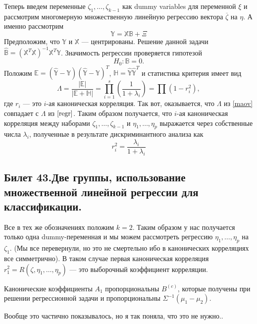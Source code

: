 Теперь введем переменные $\zeta_1, \ldots, \zeta_{k-1}$ как dummy variables для переменной $\xi$ и рассмотрим многомерную множественную линейную регрессию вектора $\overline{\zeta}$ на $\eta$.
А именно рассмотрим
\begin{equation*}
\mathbb{Y} = \mathbb{X}\mathbb{B} + \Xi
\end{equation*}
Предположим, что $\mathbb{Y}$ и $\mathbb{X}$ --- центрированы. 
Решение данной задачи $\hat{\mathbb{B}} = (\mathbb{X}^T\mathbb{X})^{-1}\mathbb{X}^T \mathbb{Y}$.
Значимость регрессии проверяется гипотезой 
\begin{equation*}
H_0: \mathbb{B} = 0.
\end{equation*} 
Положим $\mathbb{E} = (\hat{\mathbb{Y}} - \mathbb{Y})(\hat{\mathbb{Y}} - \mathbb{Y})^T$, 
$\mathbb{H} = \hat{\mathbb{Y}}\hat{\mathbb{Y}} ^T$ и статистика критерия имеет вид
\begin{equation}
\Lambda = \frac{|\mathbb{E}|}{|\mathbb{E} + \mathbb{H}|} = \prod\limits_{i = 1}^s \left(\frac{1}{1 + \lambda_i}\right) = \prod(1 - r^2_i),
\label{regr}
\end{equation}
где $r_i$ --- это $i$-ая каноническая корреляция.
Так вот, оказывается, что $\Lambda$ из \eqref{maov} совпадает с  $\Lambda$ из $\eqref{regr}$.
Таким образом получается, что $i$-ая каноническая корреляция между наборами $\zeta_1, \ldots, \zeta_{k-1}$ и $\eta_1, \ldots, \eta_p$ выражается через собственные числа $\lambda_i$, полученные в результате дискриминантного анализа как 
\begin{equation*}
r_i^2 = \frac{\lambda_i}{1 + \lambda_i}
\end{equation*}
\subsection{Билет 43.Две группы, использование	множественной линейной регрессии для классификации.}
Все в тех же обозначениях положим $k = 2$. Таким образом у нас получается только одна dummy-переменная и мы можем рассмотреть регрессию $\eta_1, \ldots, \eta_p$ на $\zeta_1$.
(Мы все перевернули, но это не смертельно ибо в канонических корреляциях все симметрично).
В таком случае первая каноническая корреляция $r^2_1 = R(\zeta, \eta_1, \ldots, \eta_p)$ --- это выборочный коэффициент корреляции.

\begin{thm}
Канонические коэффициенты $A_1$ пропорциональны $B^{(c)}$, которые получены при решении регрессионной задачи и пропорциональны $\Sigma^{-1}(\mu_1 - \mu_2)$.
\end{thm}
Вообще это частично показывалось, но я так поняла, что это не нужно..
